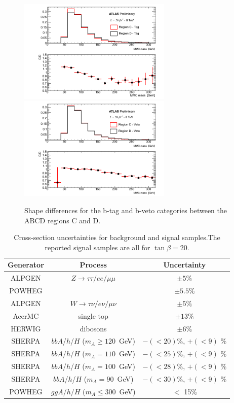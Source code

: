 \begin{figure}[tp]
	\begin{center}
	\includegraphics[width=0.65\textwidth]{figure/QCD/shape_tag.png}
	\includegraphics[width=0.65\textwidth]{figure/QCD/shape_veto.png}
	\end{center}
	\caption{Shape differences for the b-tag and b-veto categories between the ABCD regions C and D.}
	\label{fig:qcd_shape_unc}
\end{figure}






\begin{table} [t]
\centering
\begin{tabular}{c c c }
\hline
\hline
Generator & Process & Uncertainty \\ [0.5ex]
\hline
ALPGEN & $Z \rightarrow \tau\tau / ee /\mu\mu$ & $\pm 5\%$ \\
POWHEG & \ttbar					& $\pm 5.5\%$\\
ALPGEN & $W  \rightarrow \tau\nu / e\nu /\mu\nu$&  $\pm  5\%$ \\
AcerMC & single top & $\pm 13 \%$ \\
HERWIG & dibosons & $\pm 6 \%$ \\
SHERPA & $bbA$/$h$/$H$  ($m_{A} \ge 120$~GeV)     & $-(<20)$\%,  $+(<9)$ \%\\
SHERPA & $bbA$/$h$/$H$  ($m_{A} =   110$~GeV)     & $-(<25)$\%,  $+(<9)$ \%\\
SHERPA & $bbA$/$h$/$H$  ($m_{A} =   100$~GeV)     & $-(<28)$\%,  $+(<9)$ \%\\
SHERPA & $bbA$/$h$/$H$  ($m_{A} =    90$~GeV)     & $-(<30)$\%,  $+(<9)$ \%\\
POWHEG & $ggA$/$h$/$H$  ($m_{A} \le 300$~GeV)     & $<$ 15\%\\  [0.5ex]
\hline \hline 
\end{tabular}
\caption{Cross-section uncertainties for background and signal samples.The reported signal samples are all for $\tan\beta = 20$.}
\label{table:sys_xsec}
\end{table}


